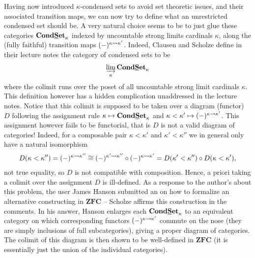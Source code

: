 \begin{remark}
	Having now introduced $\kappa$-condensed sets to avoid set theoretic issues, and their associated transition maps, we can now try to define what an unrestricted condensed set should be. A very natural choice seems to be to just glue these categories ${{{\mathbf{Cond}}}{{\mathbf{\underline{S}et}}}_{\kappa}}$ indexed by uncountable strong limits cardinals $\kappa$, along the (fully faithful) transition maps $(-)^{{\kappa\rightsquigarrow \kappa'}}$. Indeed, Clausen and Scholze define in their lecture notes \cite[Def. 2.11]{condenseddotpdf} the category of condensed sets to be
		$$\varinjlim_{\kappa} {{{\mathbf{Cond}}}{{\mathbf{\underline{S}et}}}_{\kappa}}$$
	where the colimit runs over the poset of all uncountable strong limit cardinals $\kappa$. This definition however has a hidden complication unaddressed in the lecture notes. Notice that this colimit is supposed to be taken over a diagram (\ie functor) $D$ following the assignment rule $\kappa \mapsto {{{\mathbf{Cond}}}{{\mathbf{\underline{S}et}}}_{\kappa}}$ and $\kappa<\kappa' \mapsto (-)^{{\kappa\rightsquigarrow \kappa'}}$. This assignment however fails to be functorial, that is $D$ is not a valid diagram of categories! Indeed, for a composable pair $\kappa < \kappa'$ and $\kappa'<\kappa''$ we in general only have a natural isomorphism
		$$D(\kappa <\kappa'') = (-)^{{\kappa\rightsquigarrow \kappa''}} \cong (-)^{{\kappa'\rightsquigarrow \kappa''}}\circ (-)^{{\kappa\rightsquigarrow \kappa'}}=D(\kappa'<\kappa'')\circ D(\kappa<\kappa'),$$
	not true equality, so $D$ is not compatible with composition. Hence, a priori taking a colimit over the assignment $D$ is ill-defined. As a response to the author's \cite[\href{https://mathoverflow.net/q/484165/546808}{MathOverflow post}]{non-functoriality} about this problem, the user James Hanson submitted an \cite[\href{https://mathoverflow.net/a/492047/546808}{answer}]{condensed-sets-in-zfc} on how to formalize an alternative constructing in $\mathbf{ZFC}$ -- Scholze affirms this construction in the comments. In his answer, Hanson enlarges each ${{{\mathbf{Cond}}}{{\mathbf{\underline{S}et}}}_{\kappa}}$ to an equivalent category on which corresponding functors $(-)^{\kappa\rightsquigarrow \kappa'}$ commute on the nose (they are simply inclusions of full subcategories), giving a proper diagram of categories. The colimit of this diagram is then shown to be well-defined in $\mathbf{ZFC}$ (it is essentially just the union of the individual categories).
	


\end{remark}
